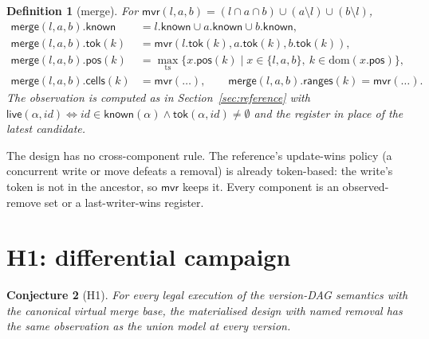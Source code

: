 \documentclass[11pt]{article}
\newtheorem{definition}{Definition}[section]
\newtheorem{conjecture}[definition]{Conjecture}
\newcommand{\merge}{\mathsf{merge}}
\newcommand{\live}{\mathsf{live}}
\newcommand{\tok}{\mathsf{tok}}
\newcommand{\pos}{\mathsf{pos}}
\newcommand{\cells}{\mathsf{cells}}
\newcommand{\ranges}{\mathsf{ranges}}
\newcommand{\mvr}{\mathsf{mvr}}
\begin{document}
\begin{definition}[merge]
For $\mvr(l,a,b)=(l\cap a\cap b)\cup(a\setminus l)\cup(b\setminus l)$,
\[
\begin{aligned}
\merge(l,a,b).\mathsf{known}&=l.\mathsf{known}\cup a.\mathsf{known}\cup b.\mathsf{known},\\
\merge(l,a,b).\tok(k)&=\mvr(l.\tok(k),a.\tok(k),b.\tok(k)),\\
\merge(l,a,b).\pos(k)&=\max_{\mathrm{ts}}\{x.\pos(k)\mid x\in\{l,a,b\},\ k\in\mathrm{dom}(x.\pos)\},\\
\merge(l,a,b).\cells(k)&=\mvr(\ldots),\qquad
\merge(l,a,b).\ranges(k)=\mvr(\ldots).
\end{aligned}
\]
The observation is computed as in Section~\ref{sec:reference} with
$\live(\alpha,\mathit{id})\Leftrightarrow\mathit{id}\in\mathsf{known}(\alpha)
\land\tok(\alpha,\mathit{id})\neq\emptyset$ and the register in place of the
latest candidate.
\end{definition}

The design has no cross-component rule. The reference's update-wins policy
(a concurrent write or move defeats a removal) is already token-based: the
write's token is not in the ancestor, so $\mvr$ keeps it. Every component is
an observed-remove set or a last-writer-wins register.

\section{H1: differential campaign}
\label{sec:h1}

\begin{conjecture}[H1]
For every legal execution of the version-DAG semantics with the
canonical virtual merge base, the materialised design with named removal has
the same observation as the union model at every version.
\end{conjecture}
\end{document}
